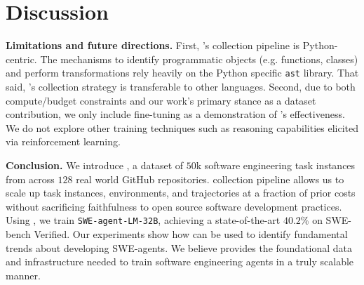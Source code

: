\section{Discussion}
\label{sec:discussion}

\textbf{Limitations and future directions.}
First, \bugs{}'s collection pipeline is Python-centric.
The mechanisms to identify programmatic objects (e.g. functions, classes) and perform transformations rely heavily on the Python specific \texttt{ast} library.
That said, \bugs{}'s collection strategy is transferable to other languages.
Second, due to both compute/budget constraints and our work's primary stance as a dataset contribution, we only include fine-tuning as a demonstration of \bugs{}'s effectiveness.
We do not explore other training techniques such as reasoning capabilities elicited via reinforcement learning.

\textbf{Conclusion.}
We introduce \bugs{}, a dataset of $50$k software engineering task instances from across $128$ real world GitHub repositories.
\bugs{} collection pipeline allows us to scale up task instances, environments, and trajectories at a fraction of prior costs without sacrificing faithfulness to open source software development practices.
Using \bugs{}, we train \texttt{SWE-agent-LM-32B}, achieving a state-of-the-art $40.2$\% on SWE-bench Verified.
Our experiments show how \bugs{} can be used to identify fundamental trends about developing SWE-agents.
We believe \bugs{} provides the foundational data and infrastructure needed to train software engineering agents in a truly scalable manner.
